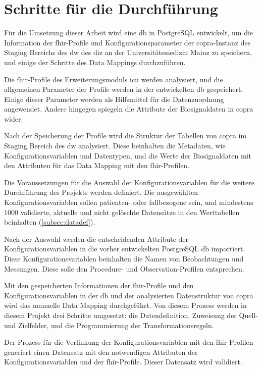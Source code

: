 \section{Schritte für die Durchführung} \label{sec:steps}

Für die Umsetzung dieser Arbeit wird eine \ac{db} in PostgreSQL entwickelt, um die Information der \ac{fhir}-Profile und Konfigurationsparameter der \ac{copra}-Instanz des Staging Bereichs des \ac{dw} des \ac{diz} an der Universitätsmedizin Mainz zu speichern, und einige der Schritte des Data Mappings durchzuführen.

Die \ac{fhir}-Profile des Erweiterungsmoduls \glqq\ac{icu}\grqq{} werden analysiert, und die allgemeinen Parameter der Profile werden in der entwickelten \ac{db} gespeichert. Einige dieser Parameter werden als Hilfsmittel für die Datenzuordnung angewendet. Andere hingegen spiegeln die Attribute der Biosignaldaten in \ac{copra} wider.

Nach der Speicherung der Profile wird die Struktur der Tabellen von \ac{copra} im Staging Bereich des \ac{dw} analysiert. Diese beinhalten die Metadaten, wie Konfigurationsvariablen und Datentypen, und die Werte der Biosignaldaten mit den Attributen für das Data Mapping mit den \ac{fhir}-Profilen. 

Die Voraussetzungen für die Auswahl der Konfigurationsvariablen für die weitere Durchführung des Projekts werden definiert. Die ausgewählten Konfigurationsvariablen sollen patienten- oder fallbezogene sein, und mindestens 1000 validierte, aktuelle und nicht gelöschte Datensätze in den Werttabellen beinhalten (\ref{subsec:datadef}).

Nach der Auswahl werden die entscheidenden Attribute der Konfigurationsvariablen in die vorher entwickelten PostgreSQL \ac{db} importiert. Diese Konfigurationsvariablen beinhalten die Namen von Beobachtungen und Messungen. Diese solle den \glqq Procedure\grqq{}- und \glqq Observation\grqq{}-Profilen entsprechen.

Mit den gespeicherten Informationen der \ac{fhir}-Profile und den Konfigurationsvariablen in der \ac{db} und der analysierten Datenstruktur von \ac{copra} wird das manuelle Data Mapping durchgeführt. Von diesem Prozess werden in diesem Projekt drei Schritte umgesetzt: die Datendefinition, Zuweisung der Quell- und Zielfelder, und die Programmierung der Transformationsregeln.

Der Prozess für die Verlinkung der Konfigurationsvariablen mit den \ac{fhir}-Profilen generiert einen Datensatz mit den notwendigen Attributen der Konfigurationsvariablen und der \ac{fhir}-Profile. Dieser Datensatz wird validiert.

